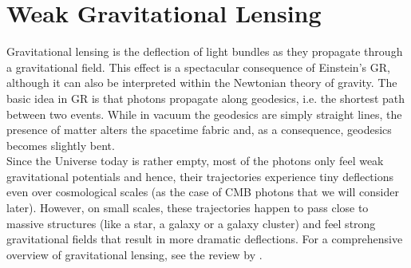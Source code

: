 \section{Weak Gravitational Lensing}
\label{sec:lensing}
Gravitational lensing is the deflection of light bundles as they propagate through a gravitational field.
This effect is a spectacular consequence of Einstein's GR, although it can also be interpreted within the
Newtonian theory of gravity. The basic idea in GR is that photons propagate along geodesics, i.e. the 
shortest path between two events. While in vacuum the geodesics are simply straight lines, the presence
of matter alters the spacetime fabric and, as a consequence, geodesics becomes slightly bent. \\
Since the Universe today is rather empty, most of the photons only feel weak gravitational potentials and
hence, their trajectories experience tiny deflections even over cosmological scales (as the case of \gls{CMB}
photons that we will consider later). However, on small scales, these trajectories happen to pass close to
massive structures (like a star, a galaxy or a galaxy cluster) and feel strong gravitational fields that result
in more dramatic deflections. For a comprehensive overview of gravitational lensing, see the  
review by \cite{Bartelmann2001}.

